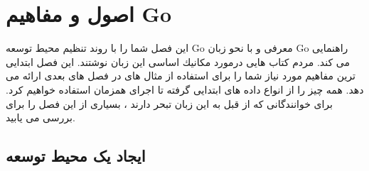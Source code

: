 
\chapter{اصول و مفاهیم Go}
این فصل شما را با روند تنظیم محیط توسعه Go معرفی و با نحو زبان Go راهنمایی می کند. مردم كتاب هایی درمورد مکانیك اساسی این زبان نوشتند. این فصل ابتدایی ترین مفاهیم مورد نیاز شما را برای استفاده از مثال های در فصل های بعدی ارائه می دهد. همه چیز را از انواع داده های ابتدایی گرفته تا اجرای همزمان استفاده خواهیم کرد. برای خوانندگانی که از قبل به این زبان تبحر دارند ، بسیاری از این فصل را برای بررسی می یابید.
\section{ایجاد یک محیط توسعه}
